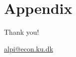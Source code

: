 \documentclass[10pt]{beamer}
\begin{document}

\newsavebox\mytempbib

\savebox\mytempbib{\parbox{\textwidth}{}}



\section*{Appendix}

\appendix
\backupbegin

\begin{frame}
    \centering
    \begin{LARGE}Thank you!\end{LARGE}

    \vspace{1em}

    \begin{Large}\href{mailto:alpi@econ.ku.dk}{alpi@econ.ku.dk}\end{Large}

\end{frame}

\end{document}
